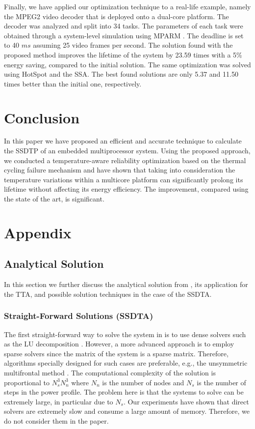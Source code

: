 Finally, we have applied our optimization technique to a real-life example,
namely the MPEG2 video decoder \cite{ffmpeg2011} that is deployed onto a
dual-core platform. The decoder was analyzed and split into 34 tasks. The
parameters of each task were obtained through a system-level simulation using
MPARM \cite{benini2005}. The deadline is set to 40 $ms$ assuming 25 video frames
per second. The solution found with the proposed method improves the lifetime of
the system by 23.59 times with a 5\% energy saving, compared to the initial
solution. The same optimization was solved using HotSpot and the SSA. The best
found solutions are only 5.37 and 11.50 times better than the initial one,
respectively.

\section{Conclusion}

In this paper we have proposed an efficient and accurate technique to calculate
the SSDTP of an embedded multiprocessor system. Using the proposed approach, we
conducted a temperature-aware reliability optimization based on the thermal
cycling failure mechanism and have shown that taking into consideration the
temperature variations within a multicore platform can significantly prolong its
lifetime without affecting its energy efficiency. The improvement, compared
using the state of the art, is significant.

\section{Appendix}

\subsection{Analytical Solution}

In this section we further discuss the analytical solution from
, its application for the TTA, and possible solution
techniques in the case of the SSDTA.

\subsubsection{Straight-Forward Solutions (SSDTA)}

The first straight-forward way to solve the system in  is to use
dense solvers such as the LU decomposition \cite{press2007}. However, a more
advanced approach is to employ sparse solvers since the matrix of the system is
a sparse matrix. Therefore, algorithms specially designed for such cases are
preferable, e.g., the unsymmetric multifrontal method \cite{davis2004}. The
computational complexity of the solution is proportional to $N_s^3 N_n^3$
\cite{press2007} where $N_n$ is the number of nodes and $N_s$ is the number of
steps in the power profile. The problem here is that the systems to solve can be
extremely large, in particular due to $N_s$. Our experiments have shown that
direct solvers are extremely slow and consume a large amount of memory.
Therefore, we do not consider them in the paper.

